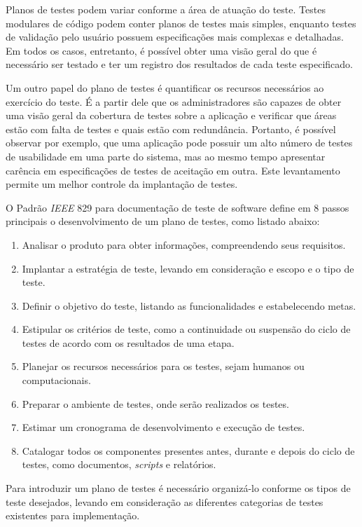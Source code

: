 Planos de testes podem variar conforme a área de atuação do teste. Testes modulares de código podem conter planos de testes mais simples, enquanto testes de validação pelo usuário possuem especificações mais complexas e detalhadas. Em todos os casos, entretanto, é possível obter uma visão geral do que é necessário ser testado e ter um registro dos resultados de cada teste especificado.

Um outro papel do plano de testes é quantificar os recursos necessários ao exercício do teste. É a partir dele que os administradores são capazes de obter uma visão geral da cobertura de testes sobre a aplicação e verificar que áreas estão com falta de testes e quais estão com redundância. Portanto, é possível observar por exemplo, que uma aplicação pode possuir um alto número de testes de usabilidade em uma parte do sistema, mas ao mesmo tempo apresentar carência em especificações de testes de aceitação em outra. Este levantamento permite um melhor controle da implantação de testes.

O Padrão \emph{IEEE} 829 \cite{software2008ieee} para documentação de teste de software define em 8 passos principais o desenvolvimento de um plano de testes, como listado abaixo:
\begin{enumerate}
    \item Analisar o produto para obter informações, compreendendo seus requisitos.
    \item Implantar a estratégia de teste, levando em consideração e escopo e o tipo de teste.
    \item Definir o objetivo do teste, listando as funcionalidades e estabelecendo metas.
    \item Estipular os critérios de teste, como a continuidade ou suspensão do ciclo de testes de acordo com os resultados de uma etapa.
    \item Planejar os recursos necessários para os testes, sejam humanos ou computacionais.
    \item Preparar o ambiente de testes, onde serão realizados os testes.
    \item Estimar um cronograma de desenvolvimento e execução de testes.
    \item Catalogar todos os componentes presentes antes, durante e depois do ciclo de testes, como documentos, \emph{scripts} e relatórios.
\end{enumerate}

Para introduzir um plano de testes é necessário organizá-lo conforme os tipos de teste desejados, levando em consideração as diferentes categorias de testes existentes para implementação.

